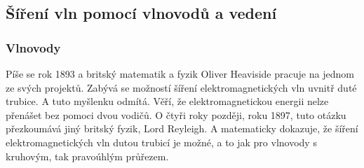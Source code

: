 \documentclass[12pt,a4paper,oneside]{article}
\numberwithin{equation}{section} %
\numberwithin{figure}{section} %
\numberwithin{table}{section} %
\renewcommand{\vec}[1]{\mbox{\boldmath$#1$}} %
\newcommand{\faz}[1]{{\underline{#1}}} %
\begin{document}
%
 
 


\newpage
\subsection{Šíření vln pomocí vlnovodů a vedení}
\subsubsection{Vlnovody}
Píše se rok 1893 a britský matematik a fyzik Oliver Heaviside pracuje na jednom ze svých projektů. Zabývá se možností šíření elektromagnetických vln uvnitř duté trubice. A tuto myšlenku odmítá. Věří, že elektromagnetickou energii nelze přenášet bez pomoci dvou vodičů. O čtyři roky později, roku 1897, tuto otázku přezkoumává jiný britský fyzik, Lord Reyleigh. A matematicky dokazuje, že šíření elektromagnetických vln dutou trubicí je možné, a to jak pro vlnovody s kruhovým, tak pravoúhlým průřezem. \cite{Pozar2}
\end{document}
